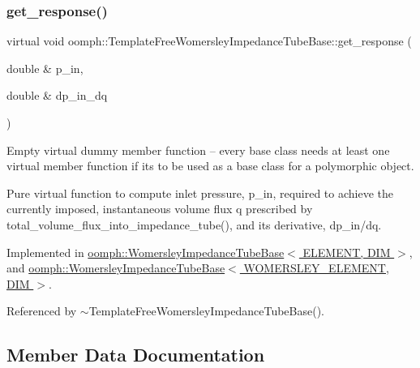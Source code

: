 \subsubsection{\texorpdfstring{get\+\_\+response()}{get\_response()}}
{\footnotesize\ttfamily virtual void oomph\+::\+Template\+Free\+Womersley\+Impedance\+Tube\+Base\+::get\+\_\+response (\begin{DoxyParamCaption}\item[{double \&}]{p\+\_\+in,  }\item[{double \&}]{dp\+\_\+in\+\_\+dq }\end{DoxyParamCaption})\hspace{0.3cm}{\ttfamily [pure virtual]}}



Empty virtual dummy member function -- every base class needs at least one virtual member function if it\textquotesingle{}s to be used as a base class for a polymorphic object. 

Pure virtual function to compute inlet pressure, p\+\_\+in, required to achieve the currently imposed, instantaneous volume flux q prescribed by total\+\_\+volume\+\_\+flux\+\_\+into\+\_\+impedance\+\_\+tube(), and its derivative, dp\+\_\+in/dq. 

Implemented in \hyperlink{classoomph_1_1WomersleyImpedanceTubeBase_a62628115802f53da76c5e4f29de628c7}{oomph\+::\+Womersley\+Impedance\+Tube\+Base$<$ E\+L\+E\+M\+E\+N\+T, D\+I\+M $>$}, and \hyperlink{classoomph_1_1WomersleyImpedanceTubeBase_a62628115802f53da76c5e4f29de628c7}{oomph\+::\+Womersley\+Impedance\+Tube\+Base$<$ W\+O\+M\+E\+R\+S\+L\+E\+Y\+\_\+\+E\+L\+E\+M\+E\+N\+T, D\+I\+M $>$}.



Referenced by $\sim$\+Template\+Free\+Womersley\+Impedance\+Tube\+Base().



\subsection{Member Data Documentation}
\mbox{\label{classoomph_1_1TemplateFreeWomersleyImpedanceTubeBase_a37b438da1f862ccadbdb80cf8258a781}} 
